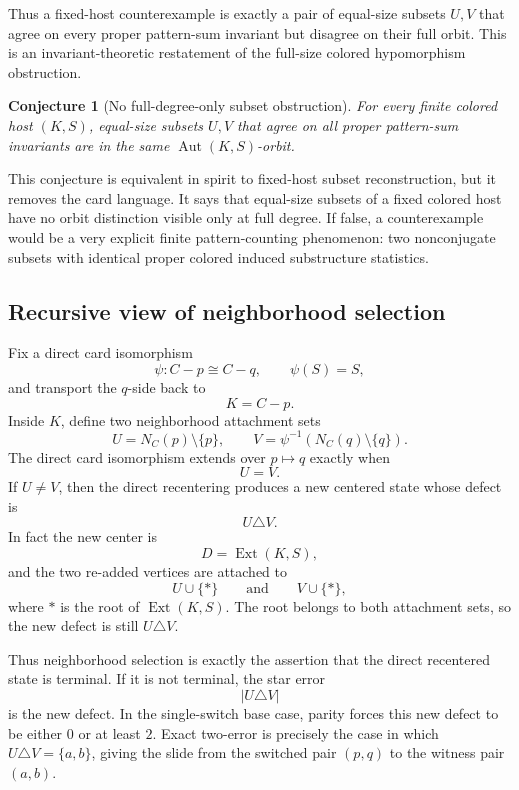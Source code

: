 \documentclass[11pt]{article}
\newtheorem{conjecture}{Conjecture}
\newcommand{\Ext}{\operatorname{Ext}}
\newcommand{\Aut}{\operatorname{Aut}}
\begin{document}
Thus a fixed-host counterexample is exactly a pair of equal-size subsets
\(U,V\) that agree on every proper pattern-sum invariant but disagree on their
full orbit.  This is an invariant-theoretic restatement of the full-size
colored hypomorphism obstruction.

\begin{conjecture}[No full-degree-only subset obstruction]
For every finite colored host \((K,S)\), equal-size subsets \(U,V\) that agree
on all proper pattern-sum invariants are in the same \(\Aut(K,S)\)-orbit.
\end{conjecture}

This conjecture is equivalent in spirit to fixed-host subset reconstruction,
but it removes the card language.  It says that equal-size subsets of a fixed
colored host have no orbit distinction visible only at full degree.  If
false, a counterexample would be a very explicit finite pattern-counting
phenomenon: two nonconjugate subsets with identical proper colored induced
substructure statistics.

\subsection{Recursive view of neighborhood selection}

Fix a direct card isomorphism
\[
  \psi:C-p\cong C-q,\qquad \psi(S)=S,
\]
and transport the \(q\)-side back to
\[
  K=C-p.
\]
Inside \(K\), define two neighborhood attachment sets
\[
  U=N_C(p)\setminus\{p\},
  \qquad
  V=\psi^{-1}(N_C(q)\setminus\{q\}).
\]
The direct card isomorphism extends over \(p\mapsto q\) exactly when
\[
  U=V.
\]
If \(U\neq V\), then the direct recentering produces a new centered state
whose defect is
\[
  U\triangle V.
\]
In fact the new center is
\[
  D=\Ext(K,S),
\]
and the two re-added vertices are attached to
\[
  U\cup\{\ast\}
  \qquad\text{and}\qquad
  V\cup\{\ast\},
\]
where \(\ast\) is the root of \(\Ext(K,S)\).  The root belongs to both
attachment sets, so the new defect is still \(U\triangle V\).

Thus neighborhood selection is exactly the assertion that the direct
recentered state is terminal.  If it is not terminal, the star error
\[
  |U\triangle V|
\]
is the new defect.  In the single-switch base case, parity forces this new
defect to be either \(0\) or at least \(2\).  Exact two-error is precisely the
case in which \(U\triangle V=\{a,b\}\), giving the slide from the switched
pair \((p,q)\) to the witness pair \((a,b)\).
\end{document}
